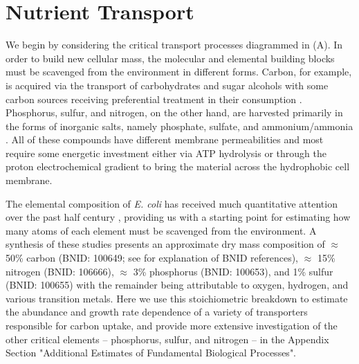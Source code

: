 \section{Nutrient Transport}
We begin by considering the critical transport processes diagrammed in
(A). In order to build new cellular mass, the molecular and
elemental building blocks must be scavenged from the environment in different
forms. Carbon, for example, is acquired via the transport of carbohydrates
and sugar alcohols with some carbon sources receiving preferential treatment
in their consumption \citep{monod1947}. Phosphorus, sulfur, and nitrogen, on
the other hand, are harvested primarily in the forms of inorganic salts,
namely phosphate, sulfate, and ammonium/ammonia \citep{jun2018,
assentoft2016, stasi2019, antonenko1997, rosenberg1977, willsky1973}. All of
these compounds have different membrane permeabilities \citep{phillips2018}
and most require some energetic investment either via ATP hydrolysis or
through the proton electrochemical gradient to bring the material across the
hydrophobic cell membrane.

The elemental composition of \textit{E. coli} has received much quantitative
attention over the past half century \citep{neidhardt1991,
taymaz-nikerel2010, heldal1985, bauer1976}, providing us with a starting
point for estimating how many atoms of each element must be scavenged from
the environment. A synthesis of these studies presents an approximate dry
mass composition of $\approx$ 50\% carbon (BNID: 100649; see
 for explanation of BNID references), $\approx$ 15\%
nitrogen (BNID: 106666), $\approx$ 3\% phosphorus (BNID: 100653), and 1\%
sulfur (BNID: 100655) with the remainder being attributable to oxygen,
hydrogen, and various transition metals. Here we use this stoichiometric breakdown
to estimate the abundance and growth rate dependence of a variety of
transporters responsible for carbon uptake, and provide more extensive
investigation of the other critical elements -- phosphorus, sulfur, and
nitrogen -- in the Appendix Section "Additional Estimates of Fundamental Biological Processes".

